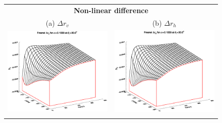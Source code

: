 \begin{figure}[htp]
  \centering
  \begin{tabular}{c c}
    \multicolumn{2}{c}{\sffamily\textbf{Non-linear difference}}\\
    \textsf{(a)} $\Delta r_v$ &
    \textsf{(b)} $\Delta r_h$ \\
    \includegraphics[bb=120 240 508 540,clip,scale=0.5]{graphics/Fresnel/FWDTL/FWDdrv_a0.1000_z20.0.eps} &
    \includegraphics[bb=120 240 508 540,clip,scale=0.5]{graphics/Fresnel/FWDTL/FWDdrh_a0.1000_z20.0.eps} \\\\

\end{tabular}
\end{figure}
